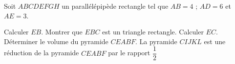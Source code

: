 \documentclass[a4paper,addpoints,12pt]{exam}
\begin{document}
\begin{exo}
Soit $ABCDEFGH$ un parallélépipède rectangle tel que $AB=4$ ; $AD=6$ et $AE=3$.
\begin{questions}
\question Calculer $EB$.
\question Montrer que $EBC$ est un triangle rectangle.
\question Calculer $EC$.
\question Déterminer le volume du pyramide $CEABF$.
\question La pyramide $CIJKL$ est une réduction de la pyramide $CEABF$ par le rapport $\dfrac{1}{2}$ 
\end{questions}
\end{exo}
\end{document}
